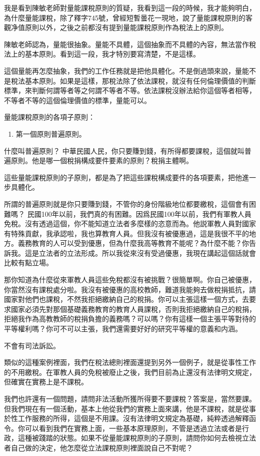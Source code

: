 \documentclass[]{ctexbook}
\providecommand{\tightlist}{%
  \setlength{\itemsep}{0pt}\setlength{\parskip}{0pt}}
\begin{document}
我是看到陳敏老師對量能課稅原則的質疑，我看到這一段的時候，我才能夠明白，為什麼量能課稅，除了釋字745號，曾經短暫曇花一現地，說了量能課稅原則的客觀净值原則以外，之後之前都沒有提到量能課稅原則作為稅法上的原則。

陳敏老師認為，量能很抽象。量能不具體，這個抽象而不具體的內容，無法當作稅法上的基本原則。看到這一段，我才特別要寫清楚，不是這樣。

這個量能再怎麼抽象，我們的工作任務就是把他具體化。不是倒過頭來說，量能不是稅法基本原則。如果是這樣，那稅法除了依法課稅，就沒有任何倫理價值的判斷標準，來判斷何謂等者等之何謂不等者不等。依法課稅沒辦法給你這個等者相等，不等者不等的這個倫理價值的標準，量能可以。

量能課稅原則的各項子原則：

\begin{enumerate}
\def\labelenumi{\arabic{enumi}.}
\tightlist
\item
  第一個原則普遍原則。
\end{enumerate}

什麼叫普遍原則？ 中華民國人民，你只要賺到錢，有所得都要課稅，這個就叫普遍原則。他是哪一個稅捐構成要件要素的原則？稅捐主體啊。

這些量能課稅原則的子原則，都是為了把這些課稅構成要件的各項要素，把他進一步具體化。

所謂的普遍原則就是你只要賺到錢，不管你的身份階級地位都要繳稅，這個會有困難嗎？ 民國100年以前，我們真的有困難。因爲民國100年以前，我們有軍教人員免稅。沒有透過這個，你不能知道立法者多麼樣的恣意而為。他説軍教人員對國家有特殊貢獻，我承認啦，我也算教育人員。但我沒有被優惠過，這是我很不平的地方。義務教育的人可以受到優惠，但為什麼我高等教育不能呢？為什麼不能？你告訴我。這是立法者的立法形成。所以我從來沒有受過優惠，我現在講起這個話就會比較有點立場。

那你知道為什麼從來軍教人員這些免稅都沒有被挑戰？很簡單啊。你自己被優惠，你當然沒有課稅處分啦。我沒有被優惠的高校教師，難道我能夠去做稅捐抵抗，請國家對他們也課稅，不然我拒絕繳納自己的稅捐。你可以主張這樣一個方式，去要求國家必須先對那個基礎義務教育的教育人員課稅，否則我拒絕繳納自己的稅捐，拒絕我作為高教教師的稅捐負擔的義務嗎？可以嗎？你有這樣一個主張平等對待的平等權利嗎？你可不可以主張，我們還需要好好的研究平等權的意義和内涵。

不會有司法訴訟。

類似的這種案例裡面，我們在稅法總則裡面還提到另外一個例子，就是從事性工作的不用繳稅。在軍教人員的免稅被廢止之後，我們目前為止還沒有法律明文規定，但確實在實務上是不課稅。

我們也許還有一個問題，請問非法活動所獲所得要不要課稅？答案是，當然要課。但我們現在有一個活動，基本上他從我們的實務上面來講，他是不課稅，就是從事於性工作服務的所得，這個是不用課。沒有法律明文規定為基礎，純粹透過解釋函令。你可以看到我們在實務上面，一些基本原理原則，不管是透過立法或者是行政，這種被踐踏的狀態。如果不從量能課稅原則的子原則，請問你如何去檢視立法者自己做的決定，他怎麼從立法課稅原則裡面說自己不對呢？
\end{document}

